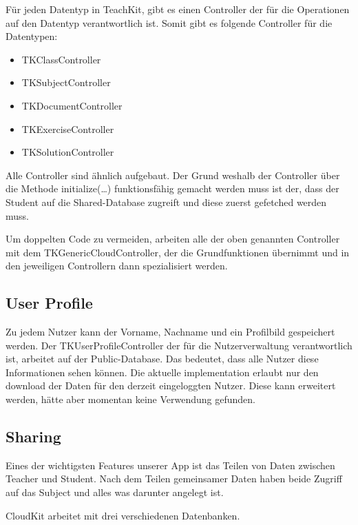 Für jeden Datentyp in TeachKit, gibt es einen Controller der für die Operationen auf den Datentyp verantwortlich ist.
Somit gibt es folgende Controller für die Datentypen:

\begin{itemize}

\item TKClassController
\item TKSubjectController
\item TKDocumentController
\item TKExerciseController
\item TKSolutionController

\end{itemize}

Alle Controller sind ähnlich aufgebaut. Der Grund weshalb der Controller über die Methode initialize(…) funktionsfähig gemacht werden muss ist der, dass der Student auf die Shared-Database zugreift und diese zuerst gefetched werden muss.

Um doppelten Code zu vermeiden, arbeiten alle der oben genannten Controller mit dem TKGenericCloudController, der die Grundfunktionen übernimmt und in den jeweiligen Controllern dann spezialisiert werden.

\subsection{User Profile}

Zu jedem Nutzer kann der Vorname, Nachname und ein Profilbild gespeichert werden. Der TKUserProfileController der für die Nutzerverwaltung verantwortlich ist, arbeitet auf der Public-Database. Das bedeutet, dass alle Nutzer diese Informationen sehen können. Die aktuelle implementation erlaubt nur den download der Daten für den derzeit eingeloggten Nutzer. Diese kann erweitert werden, hätte aber momentan keine Verwendung gefunden.

\newpage

\subsection{Sharing}

Eines der wichtigsten Features unserer App ist das Teilen von Daten zwischen Teacher und Student. Nach dem Teilen gemeinsamer Daten haben beide Zugriff auf das Subject und alles was darunter angelegt ist.

CloudKit arbeitet mit drei verschiedenen Datenbanken.


